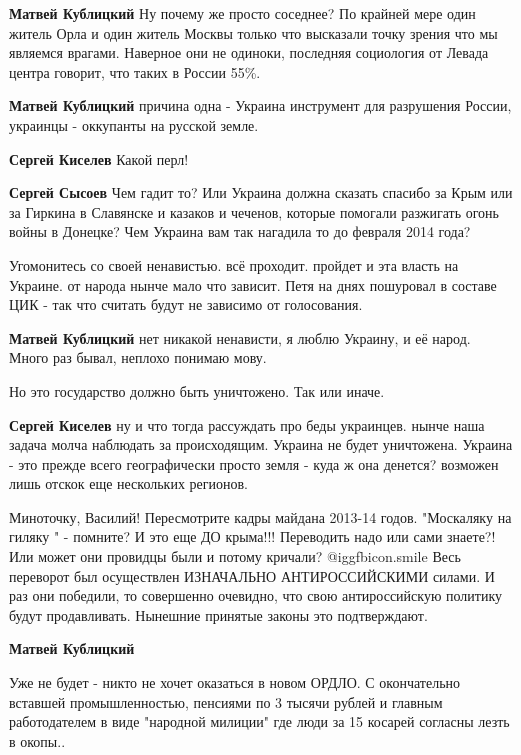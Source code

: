 \begin{itemize}
\begin{itemize}
\textbf{Матвей Кублицкий} Ну почему же просто соседнее? По крайней мере один житель Орла и один житель Москвы только что высказали точку зрения что мы являемся врагами. Наверное они не одиноки, последняя социология от Левада центра говорит, что таких в России 55\%.

\textbf{Матвей Кублицкий} причина одна - Украина инструмент для разрушения России, украинцы - оккупанты на русской земле.

\textbf{Сергей Киселев} Какой перл!

\textbf{Сергей Сысоев} Чем гадит то? Или Украина должна сказать спасибо за Крым или за Гиркина в Славянске и казаков и чеченов, которые помогали разжигать огонь войны в Донецке? Чем Украина вам так нагадила то до февраля 2014 года?

Угомонитесь со своей ненавистью. всё проходит. пройдет и эта власть на Украине. от народа нынче мало что зависит. Петя на днях пошуровал в составе ЦИК - так что считать будут не зависимо от голосования.

\textbf{Матвей Кублицкий} нет никакой ненависти, я люблю Украину, и её народ. Много раз бывал, неплохо понимаю мову.

Но это государство должно быть уничтожено. Так или иначе.

\textbf{Сергей Киселев} ну и что тогда рассуждать про беды украинцев. нынче наша задача молча наблюдать за происходящим. Украина не будет уничтожена. Украина - это прежде всего географически просто земля - куда ж она денется? возможен лишь отскок еще нескольких регионов.


\obeycr
Миноточку, Василий!
Пересмотрите кадры майдана 2013-14 годов.
"Москаляку на гиляку " - помните?
И это еще ДО крыма!!!
Переводить надо или сами знаете?!
Или может они провидцы были и потому кричали?
 @igg{fbicon.smile} 
Весь переворот был осуществлен ИЗНАЧАЛЬНО АНТИРОССИЙСКИМИ силами.
И раз они победили, то совершенно очевидно, что свою антироссийскую политику будут продавливать.
Нынешние принятые законы это подтверждают.
\restorecr

\textbf{Матвей Кублицкий} 

Уже не будет - никто не хочет оказаться в новом ОРДЛО. С окончательно вставшей
промышленностью, пенсиями по 3 тысячи рублей и главным работодателем в виде
"народной милиции" где люди за 15 косарей согласны лезть в окопы..


\end{itemize}
\end{itemize}
